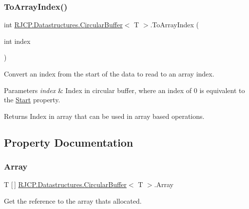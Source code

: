 \subsubsection{\texorpdfstring{ToArrayIndex()}{ToArrayIndex()}}
{\footnotesize\ttfamily int \mbox{\hyperlink{class_r_j_c_p_1_1_datastructures_1_1_circular_buffer}{R\+J\+C\+P.\+Datastructures.\+Circular\+Buffer}}$<$ T $>$.To\+Array\+Index (\begin{DoxyParamCaption}\item[{int}]{index }\end{DoxyParamCaption})}



Convert an index from the start of the data to read to an array index. 


\begin{DoxyParams}{Parameters}
{\em index} & Index in circular buffer, where an index of 0 is equivalent to the \mbox{\hyperlink{class_r_j_c_p_1_1_datastructures_1_1_circular_buffer_ae484f7e6b94997f0079b1d826db7debb}{Start}} property.\\
\hline
\end{DoxyParams}
\begin{DoxyReturn}{Returns}
Index in array that can be used in array based operations.
\end{DoxyReturn}


\subsection{Property Documentation}
\mbox{\label{class_r_j_c_p_1_1_datastructures_1_1_circular_buffer_a5479e52f4d48c74d313e078c10261c7b}} 
\subsubsection{\texorpdfstring{Array}{Array}}
{\footnotesize\ttfamily T \mbox{[}$\,$\mbox{]} \mbox{\hyperlink{class_r_j_c_p_1_1_datastructures_1_1_circular_buffer}{R\+J\+C\+P.\+Datastructures.\+Circular\+Buffer}}$<$ T $>$.Array\hspace{0.3cm}{\ttfamily [get]}}



Get the reference to the array that\textquotesingle{}s allocated. 

